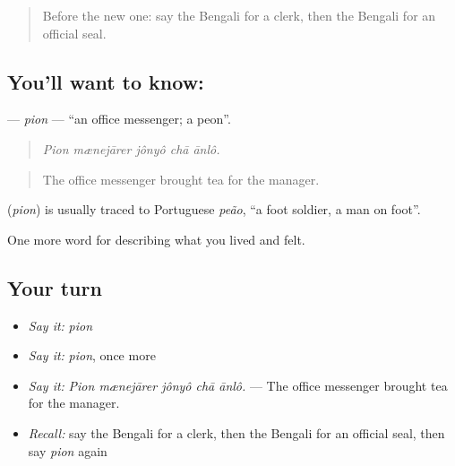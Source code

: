 \label{lesson:BN-C493-pion}



\begin{quote}
Before the new one: say the Bengali for a clerk, then the Bengali for an official seal.
\end{quote}

\subsection*{You'll want to know: }
\textbf{} — \emph{pion} — \textquotedblleft{}an office messenger; a peon\textquotedblright{}.

\begin{quote}
    
\end{quote}

\begin{quote}
\emph{Pion mænejārer jônyô chā ānlô.}
\end{quote}

\begin{quote}
The office messenger brought tea for the manager.
\end{quote}

\begin{cousinweb}
\textbf{} (\emph{pion}) is usually traced to Portuguese \emph{peão}, \textquotedblleft{}a foot soldier, a man on foot\textquotedblright{}.
\end{cousinweb}

\begin{grammarlens}[title={What you've built}]
One more word for describing what you lived and felt.
\end{grammarlens}

\subsection*{Your turn}
\begin{itemize}
\raggedright
  \item \emph{Say it:} \emph{pion}
  \item \emph{Say it:} \emph{pion}, once more
  \item \emph{Say it:} \emph{Pion mænejārer jônyô chā ānlô.} — The office messenger brought tea for the manager.
  \item \emph{Recall:} say the Bengali for a clerk, then the Bengali for an official seal, then say \emph{pion} again
\end{itemize}

